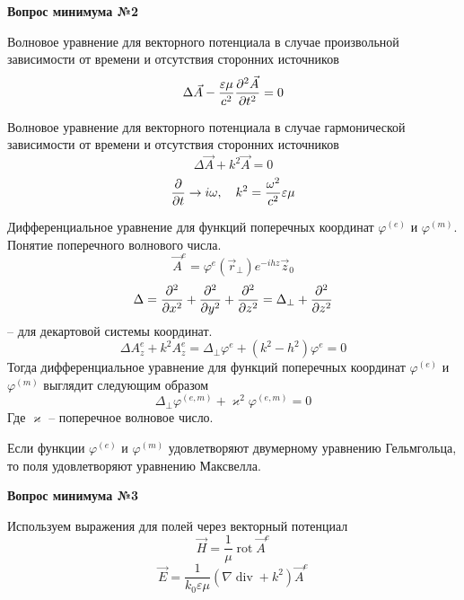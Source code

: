 \documentclass[a4paper,14pt]{extarticle}
\DeclareMathOperator{\Div}{div}
\DeclareMathOperator{\Rot}{rot}
\renewcommand{\phi}{\varphi}
\renewcommand{\epsilon}{\varepsilon}
\renewcommand{\kappa}{\varkappa}
\newcommand{\ticket}[1] {
\newpage
\hypertarget{num#1}{}
\begin{center}
	\textbf{Вопрос минимума №#1 }
\end{center}
}
\begin{document}
	\ticket{2}
	Волновое уравнение для векторного потенциала в случае произвольной зависимости от времени и отсутствия сторонних источников
\begin{equation}
	\Delta\vec{A} -\frac{\epsilon\mu}{c^2}\pdv[2]{\vec{A}}{t}=0
\end{equation} 
	
	Волновое уравнение для векторного потенциала в случае гармонической зависимости от времени и отсутствия сторонних источников
\begin{equation}
	\Delta\vec{A} + k^2 \vec{A}=0
\end{equation}
\begin{equation}
	\pdv{}{t} \to i\omega, \quad k^2=\frac{\omega^2}{c^2}\epsilon\mu
\end{equation}
	
	Дифференциальное уравнение для функций поперечных координат $\phi^{(e)}$ и $\phi^{(m)}$. Понятие поперечного волнового числа.
\begin{equation}
	\vec{A}^e = \phi^e(\vec{r}_\perp)e^{-ihz}\vec{z}_0
\end{equation}
\begin{equation}
	\Delta = \pdv[2]{}{x}+\pdv[2]{}{y}+\pdv[2]{}{z}=\Delta_\perp+\pdv[2]{}{z}
\end{equation} -- для декартовой системы координат.
\begin{equation}
	\Delta A_z^e + k^2 A_z^e=\Delta_\perp\phi^e + (k^2-h^2)\phi^e=0
\end{equation}
	Тогда дифференциальное уравнение для функций поперечных координат $\phi^{(e)}$ и $\phi^{(m)}$  выглядит следующим образом
\begin{equation}
	\Delta_\perp\phi^{(e,m)} + \kappa^2\phi^{(e,m)}=0
\end{equation}
	Где $\kappa$ -- поперечное волновое число. 	
	
	Если функции $\phi^{(e)}$ и $\phi^{(m)}$ удовлетворяют двумерному уравнению Гельмгольца, то поля удовлетворяют уравнению Максвелла.






\ticket{3}
Используем выражения для полей через векторный потенциал
\begin{equation}
	\vec{H}=\frac{1}{\mu} \Rot\vec{A}^e 
\end{equation}
\begin{equation}
	\vec{E}=\frac{1}{k_0\epsilon\mu}(\nabla \Div + k^2)\vec{A}^e 
\end{equation}
	
\end{document}
